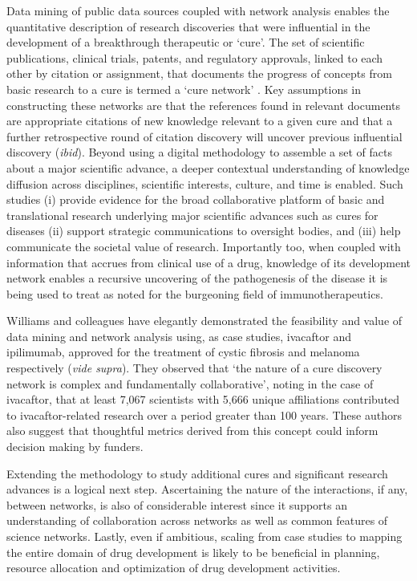 \documentclass[10pt,letterpaper]{article}
\begin{document}
Data mining of public data sources coupled with network analysis enables the quantitative description of research discoveries that were influential in the development of a breakthrough therapeutic or `cure'.  The set of scientific publications, clinical trials, patents, and regulatory approvals, linked to each other by citation or assignment, that documents the progress of concepts from basic research to a cure is termed a `cure network' \cite {bibWilliams}. Key assumptions in constructing these networks are that the references found in relevant documents are appropriate citations of new knowledge relevant to a given cure and that a further retrospective round of citation discovery will uncover previous influential discovery (\textit{ibid}). Beyond using a digital methodology to assemble a set of facts about a major scientific advance, a deeper contextual understanding of knowledge diffusion across disciplines, scientific interests, culture, and time\cite{bibMaldame} is enabled. Such studies (i) provide evidence for the broad collaborative platform of basic and translational research underlying major scientific advances such as cures for diseases \cite {bibLauer} (ii) support strategic communications to oversight bodies, and (iii) help communicate the societal value of research. Importantly too, when coupled with information that accrues from clinical use of a drug, knowledge of its development network enables a recursive uncovering of the pathogenesis of the disease it is being used to treat as noted for the burgeoning field of immunotherapeutics\cite{bibChan}. 

Williams and colleagues have elegantly demonstrated the feasibility and value of data mining and network analysis using, as case studies, ivacaftor and ipilimumab, approved for the treatment of cystic fibrosis and melanoma respectively (\textit{vide supra}). They observed that `the nature of a cure discovery network is complex and fundamentally collaborative', noting in the case of ivacaftor, that at least 7,067 scientists with 5,666 unique affiliations contributed to ivacaftor-related research over a period greater than 100 years. These authors also suggest that thoughtful metrics derived from this concept could inform decision making by funders.

Extending the methodology to study additional cures and significant research advances is a logical next step. Ascertaining the nature of the interactions, if any, between networks, is also of considerable interest since it supports an understanding of collaboration across networks as well as common features of science networks. Lastly, even if ambitious, scaling from case studies to mapping the entire domain of drug development is likely to be beneficial in planning, resource allocation and optimization of drug development activities. 
\end{document}
